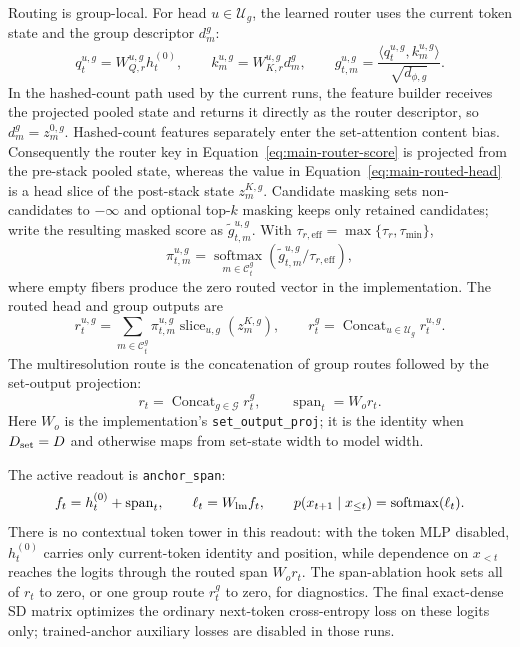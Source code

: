 \documentclass{article}
\theoremstyle{plain}
\theoremstyle{definition}
\theoremstyle{remark}
\begin{document}
Routing is group-local.  For head $u\in\mathcal U_g$, the learned router uses
the current token state and the group descriptor $d_m^g$:
\begin{equation}
\label{eq:main-router-score}
q_t^{u,g}=W_{Q,r}^{u,g}h_t^{(0)},\qquad
k_m^{u,g}=W_{K,r}^{u,g}d_m^g,\qquad
g_{t,m}^{u,g}=\frac{\langle q_t^{u,g},k_m^{u,g}\rangle}{\sqrt{d_{\phi,g}}}.
\end{equation}
In the hashed-count path used by the current runs, the feature builder receives
the projected pooled state and returns it directly as the router descriptor, so
$d_m^g=z_m^{0,g}$.  Hashed-count features separately enter the set-attention
content bias.  Consequently the router key in
Equation~\eqref{eq:main-router-score} is projected from the pre-stack pooled
state, whereas the value in Equation~\eqref{eq:main-routed-head} is a head slice
of the post-stack state $z_m^{K,g}$.  Candidate masking sets non-candidates to $-\infty$
and optional top-$k$ masking keeps only retained candidates; write the resulting
masked score as $\tilde g_{t,m}^{u,g}$.  With
$\tau_{r,\mathrm{eff}}=\max\{\tau_r,\tau_{\min}\}$,
\begin{equation}
\label{eq:main-routing-probs}
\pi_{t,m}^{u,g}=
\operatorname*{softmax}_{m\in\mathcal C_t^g}
\left(\tilde g_{t,m}^{u,g}/\tau_{r,\mathrm{eff}}\right),
\end{equation}
where empty fibers produce the zero routed vector in the implementation.
The routed head and group outputs are
\begin{equation}
\label{eq:main-routed-head}
r_t^{u,g}=\sum_{m\in\mathcal C_t^g}\pi_{t,m}^{u,g}
\operatorname{slice}_{u,g}(z_m^{K,g}),\qquad
r_t^g=\operatorname{Concat}_{u\in\mathcal U_g}r_t^{u,g}.
\end{equation}
The multiresolution route is the concatenation of group routes followed by the
set-output projection:
\begin{equation}
\label{eq:set-dictionary-span}
r_t=\operatorname{Concat}_{g\in\mathcal G}r_t^g,\qquad
\operatorname{span}_t=W_o r_t .
\end{equation}
Here $W_o$ is the implementation's \texttt{set\_output\_proj}; it is the identity
when $D_{\rm set}=D$ and otherwise maps from set-state width to model width.

The active readout is \texttt{anchor\_span}:
\begin{equation}
\label{eq:main-anchor-span}
f_t=h_t^{(0)}+\operatorname{span}_t,\qquad
\ell_t=W_{\rm lm}f_t,\qquad
p(x_{t+1}\mid x_{\le t})=\operatorname{softmax}(\ell_t).
\end{equation}
There is no contextual token tower in this readout: with the token MLP disabled,
$h_t^{(0)}$ carries only current-token identity and position, while dependence on
$x_{<t}$ reaches the logits through the routed span $W_o r_t$.  The span-ablation
hook sets all of $r_t$ to zero, or one group route $r_t^g$ to zero, for
diagnostics.  The final exact-dense SD matrix optimizes the ordinary next-token
cross-entropy loss on these logits only; trained-anchor auxiliary losses are
disabled in those runs.
\end{document}
